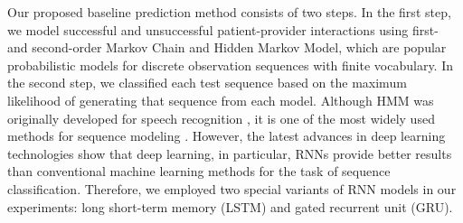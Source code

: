 \documentclass{amia_summit_2018}
\begin{document}
Our proposed baseline prediction method consists of two steps. In the first step, we model successful and unsuccessful patient-provider interactions using first- and second-order Markov Chain and Hidden Markov Model, which are popular probabilistic models for discrete observation sequences with finite vocabulary. In the second step, we classified each test sequence based on the maximum likelihood of generating that sequence from each model. Although HMM was originally developed for speech recognition \cite{rabiner1989tutorial}, it is one of the most widely used methods for sequence modeling \cite{mutsam2016maximum, won2004training, chai2001folk}. However, the latest advances in deep learning technologies show that deep learning, in particular, RNNs provide better results than conventional machine learning methods for the task of sequence classification. Therefore, we employed two special variants of RNN models in our experiments: long short-term memory (LSTM) and gated recurrent unit (GRU).
\end{document}
